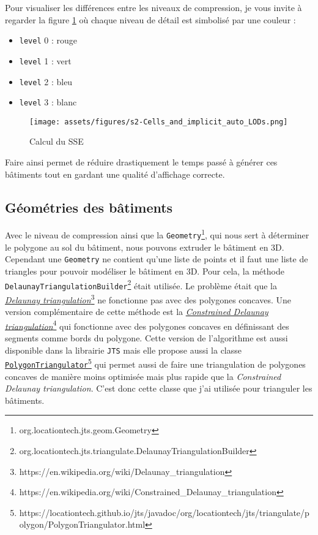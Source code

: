 Pour visualiser les différences entre les niveaux de compression, je vous invite à regarder la figure \ref{fig:lods-colors} où chaque niveau de détail est simbolisé par une couleur :

\begin{itemize}
    \item \texttt{level} 0 : rouge
    \item \texttt{level} 1 : vert
    \item \texttt{level} 2 : bleu
    \item \texttt{level} 3 : blanc
\end{itemize}


\begin{figure}[H]
    \centering
    \texttt{[image: assets/figures/s2-Cells\_and\_implicit\_auto\_LODs.png]}
    \caption{Calcul du SSE \cite{3d-tiles-specification}}
    \label{fig:lods-colors}
\end{figure}

Faire ainsi permet de réduire drastiquement le temps passé à générer ces bâtiments tout en gardant une qualité d'affichage correcte.

\subsection{Géométries des bâtiments}

Avec le niveau de compression ainsi que la \texttt{Geometry}\footnote{org.locationtech.jts.geom.Geometry}, qui nous sert à déterminer le polygone au sol du bâtiment, nous pouvons extruder le bâtiment en 3D. Cependant une \texttt{Geometry} ne contient qu'une liste de points et il faut une liste de triangles pour pouvoir modéliser le bâtiment en 3D. Pour cela, la méthode \texttt{DelaunayTriangulationBuilder}\footnote{org.locationtech.jts.triangulate.DelaunayTriangulationBuilder} était utilisée. Le problème était que la \href{https://en.wikipedia.org/wiki/Delaunay_triangulation}{\textit{Delaunay triangulation}}\footnote{https://en.wikipedia.org/wiki/Delaunay\_triangulation} ne fonctionne pas avec des polygones concaves. Une version complémentaire de cette méthode est la \href{https://en.wikipedia.org/wiki/Constrained_Delaunay_triangulation}{\textit{Constrained Delaunay triangulation}}\footnote{https://en.wikipedia.org/wiki/Constrained\_Delaunay\_triangulation} qui fonctionne avec des polygones concaves en définissant des segments comme bords du polygone. Cette version de l'algorithme est aussi disponible dans la librairie \texttt{JTS} mais elle propose aussi la classe \href{https://locationtech.github.io/jts/javadoc/org/locationtech/jts/triangulate/polygon/PolygonTriangulator.html}{\texttt{PolygonTriangulator}}\footnote{https://locationtech.github.io/jts/javadoc/org/locationtech/jts/triangulate/polygon/PolygonTriangulator.html} qui permet aussi de faire une triangulation de polygones concaves de manière moins optimisée mais plus rapide que la \textit{Constrained Delaunay triangulation}. C'est donc cette classe que j'ai utilisée pour trianguler les bâtiments.

